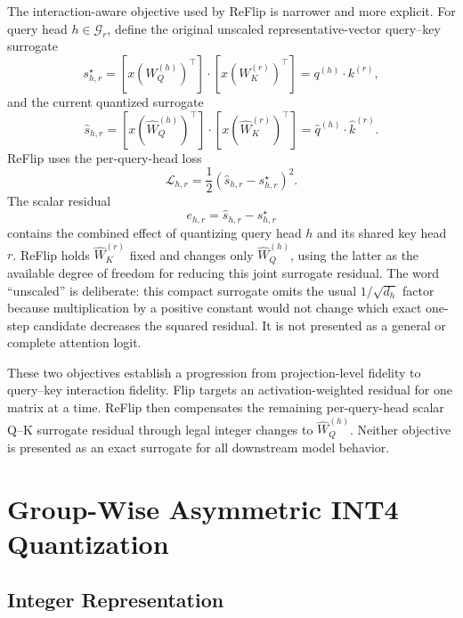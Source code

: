 The interaction-aware objective used by ReFlip is narrower and more explicit. For query head $h\in\mathcal{G}_r$, define the original unscaled representative-vector query--key surrogate
\begin{equation}
s_{h,r}^\star
=
\left[x(W_Q^{(h)})^\top\right]\cdot
\left[x(W_K^{(r)})^\top\right]
=q^{(h)}\cdot k^{(r)},
\end{equation}
and the current quantized surrogate
\begin{equation}
\hat{s}_{h,r}
=
\left[x(\hat W_Q^{(h)})^\top\right]\cdot
\left[x(\hat W_K^{(r)})^\top\right]
=\hat q^{(h)}\cdot\hat k^{(r)}.
\end{equation}
ReFlip uses the per-query-head loss
\begin{equation}
\mathcal{L}_{h,r}
=\frac{1}{2}(\hat{s}_{h,r}-s_{h,r}^\star)^2.
\end{equation}
The scalar residual
\begin{equation}
e_{h,r}=\hat{s}_{h,r}-s_{h,r}^\star
\end{equation}
contains the combined effect of quantizing query head $h$ and its shared key head $r$. ReFlip holds $\hat W_K^{(r)}$ fixed and changes only $\hat W_Q^{(h)}$, using the latter as the available degree of freedom for reducing this joint surrogate residual. The word ``unscaled'' is deliberate: this compact surrogate omits the usual $1/\sqrt{d_h}$ factor because multiplication by a positive constant would not change which exact one-step candidate decreases the squared residual. It is not presented as a general or complete attention logit.

These two objectives establish a progression from projection-level fidelity to query--key interaction fidelity. Flip targets an activation-weighted residual for one matrix at a time. ReFlip then compensates the remaining per-query-head scalar Q--K surrogate residual through legal integer changes to $\hat W_Q^{(h)}$. Neither objective is presented as an exact surrogate for all downstream model behavior.

\section{Group-Wise Asymmetric INT4 Quantization}

\subsection{Integer Representation}

